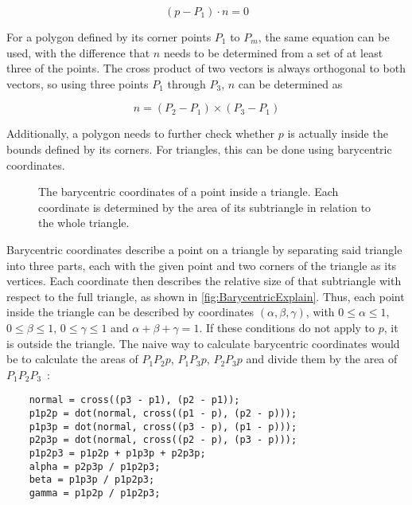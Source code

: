 \begin{equation}\label{StaticSurface}
    (p - P_1) \cdot n = 0
\end{equation}

For a polygon defined by its corner points \(P_{1}\) to \(P_{m}\), the same equation can be used,
with the difference that \(n\) needs to be determined from a set of at least three of the points.
The cross product of two vectors is always orthogonal to both vectors, so using three points \(P_{1}\) through \(P_{3}\),
\(n\) can be determined as

\begin{equation}\label{PolygonNormal}
    n = (P_{2} - P_{1}) \times (P_{3} - P_{1})
\end{equation}

Additionally, a polygon needs to further check whether \(p\) is actually inside the bounds defined by its corners.
For triangles, this can be done using barycentric coordinates.
\newline
\begin{figure}[t!]
    \begin{center}
    
    \end{center}
    \caption{The barycentric coordinates of a point inside a triangle. Each coordinate is determined by the area of its subtriangle in relation to the whole triangle.}\label{fig:BarycentricExplain}
\end{figure}
Barycentric coordinates describe a point on a triangle by separating said triangle into three parts,
each with the given point and two corners of the triangle as its vertices.
Each coordinate then describes the relative size of that subtriangle with respect to the full triangle,
as shown in \autoref{fig:BarycentricExplain}.
\newline
Thus, each point inside the triangle can be described by coordinates \((\alpha, \beta, \gamma)\),
with \(0 \le \alpha \le 1\), \(0 \le \beta \le 1\), \(0 \le \gamma \le 1\) and \(\alpha + \beta + \gamma = 1\).
If these conditions do not apply to \(p\), it is outside the triangle.
\newline
The naive way to calculate barycentric coordinates would be to calculate the areas of \(P_1P_2p\), \(P_1P_3p\), \(P_2P_3p\) and
divide them by the area of \(P_1P_2P_3\)~\cite{SM09}:
\begin{verbatim}
    normal = cross((p3 - p1), (p2 - p1));
    p1p2p = dot(normal, cross((p1 - p), (p2 - p)));
    p1p3p = dot(normal, cross((p3 - p), (p1 - p)));
    p2p3p = dot(normal, cross((p2 - p), (p3 - p)));
    p1p2p3 = p1p2p + p1p3p + p2p3p;
    alpha = p2p3p / p1p2p3;
    beta = p1p3p / p1p2p3;
    gamma = p1p2p / p1p2p3;
\end{verbatim}
